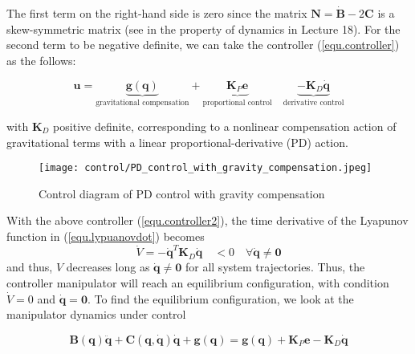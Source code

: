 \documentclass[10pt]{article}
\begin{document}
The first term on the right-hand side is zero since the matrix $\boldsymbol{N}=\dot{\boldsymbol{B}}-2 \boldsymbol{C}$ is a skew-symmetric matrix (see in the property of dynamics in Lecture 18). For the second term to be  negative definite, we can take the controller (\ref{equ.controller}) as the follows:

\begin{shaded}
\begin{equation}\label{equ.controller2}
\boldsymbol{u}=\underbrace{\boldsymbol{g}(\boldsymbol{q})}_{\text{gravitational compensation}}+\underbrace{\boldsymbol{K}_{P} \boldsymbol{e}}_{\text{proportional control}}\quad\underbrace{-\boldsymbol{K}_{D} \dot{\boldsymbol{q}}}_{\text{derivative control}}
\end{equation}
\end{shaded}

with $\boldsymbol{K}_{D}$ positive definite, corresponding to a nonlinear compensation action
of gravitational terms with a linear proportional-derivative (PD) action.

\begin{figure}[H]
    \centering
    \texttt{[image: control/PD\_control\_with\_gravity\_compensation.jpeg]}
    \caption{Control diagram of PD control with gravity compensation}
    \label{fig:enter-label}
\end{figure}





With the above controller (\ref{equ.controller2}), the time derivative of the Lyapunov function in (\ref{equ.lypuanovdot}) becomes
\begin{equation}
    \dot{V}=-\boldsymbol{\dot{q}}^T\boldsymbol{K}_D\boldsymbol{\dot{q}} \quad <0 \quad \forall \dot{\boldsymbol{q}}  \neq \mathbf{0}
\end{equation}
and thus, $V$ decreases long as $\dot{\boldsymbol{q}} \neq \mathbf{0}$ for all system trajectories. Thus, the controller manipulator will reach an equilibrium configuration, with condition $\dot{V}= 0$ and $\dot{\boldsymbol{q}}=\mathbf{0}$. To find the equilibrium configuration, we look at the manipulator dynamics under control

$$
\boldsymbol{B}(\boldsymbol{q}) \ddot{\boldsymbol{q}}+\boldsymbol{C}(\boldsymbol{q}, \dot{\boldsymbol{q}}) \dot{\boldsymbol{q}}+\boldsymbol{g}(\boldsymbol{q})=\boldsymbol{g}(\boldsymbol{q})+\boldsymbol{K}_{P} {\boldsymbol{e}}-\boldsymbol{K}_{D} \dot{\boldsymbol{q}}
$$
\end{document}
